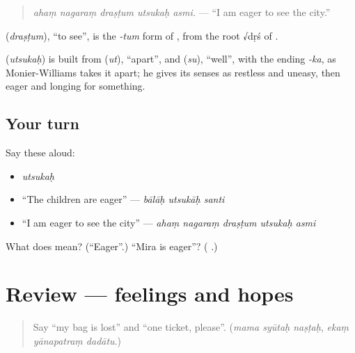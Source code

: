 \begin{quote}
\emph{ahaṃ nagaraṃ draṣṭum utsukaḥ asmi.} — \textquotedblleft{}I am eager to see the city.\textquotedblright{}
\end{quote}

\textbf{} (\emph{draṣṭum}), \textquotedblleft{}to see\textquotedblright{}, is the \emph{-tum} form of \textbf{}, from the root √dṛś of \textbf{}.

\begin{cousinweb}
\textbf{} (\emph{utsukaḥ}) is built from \textbf{} (\emph{ut}), \textquotedblleft{}apart\textquotedblright{}, and \textbf{} (\emph{su}), \textquotedblleft{}well\textquotedblright{}, with the ending \emph{-ka}, as Monier-Williams takes it apart; he gives its senses as restless and uneasy, then eager and longing for something.
\end{cousinweb}

\subsection*{Your turn}
Say these aloud:

\begin{itemize}
\raggedright
  \item \emph{utsukaḥ}
  \item \textquotedblleft{}The children are eager\textquotedblright{} — \emph{bālāḥ utsukāḥ santi}
  \item \textquotedblleft{}I am eager to see the city\textquotedblright{} — \emph{ahaṃ nagaraṃ draṣṭum utsukaḥ asmi}
\end{itemize}

\begin{tcolorbox}[breakable,colback=teal!4,colframe=teal!35!black,title={Before you move on}]
What does \textbf{} mean? (\textquotedblleft{}Eager\textquotedblright{}.) \textquotedblleft{}Mira is eager\textquotedblright{}? (\textbf{  }.)
\end{tcolorbox}
\section[(review)]{Review — feelings and hopes}

\label{lesson:SA-R282-feelings-and-hopes}



\begin{quote}
Say \textquotedblleft{}my bag is lost\textquotedblright{} and \textquotedblleft{}one ticket, please\textquotedblright{}. (\emph{mama syūtaḥ naṣṭaḥ}, \emph{ekaṃ yānapatraṃ dadātu}.)
\end{quote}

